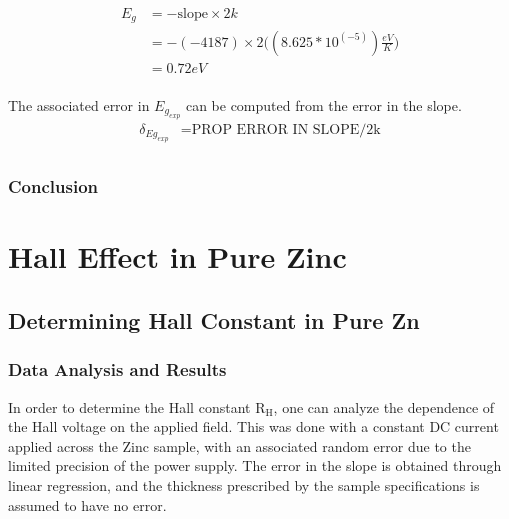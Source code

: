 \documentclass[a4paper]{article}
\begin{document}
\begin{align*}
E_g &= - \text{slope} \times 2k \\
    &= - (-4187) \times 2
       \Big(( 8.625 * 10^(-5)) \frac{eV}{K} \Big) \\
    &= 0.72 eV \\
\end{align*}

The associated error in $E_{g_{exp}}$ can be computed from the error in the slope.
\begin{align*}
\delta_{Eg_{exp}} &= \text{PROP ERROR IN SLOPE/2k} \\
\end{align*}


\subsubsection{Conclusion}

\section{Hall Effect in Pure Zinc}

\subsection{Determining Hall Constant in Pure Zn}

\subsubsection{Data Analysis and Results}
\qq In order to determine the Hall constant $\text{R}_\text{H}$, one can
analyze the dependence of the Hall voltage on the applied field. This
was done with a constant DC current applied across the Zinc sample, with
an associated random error due to the limited precision of the power
supply. The error in the slope is obtained through linear regression,
and the thickness prescribed by the sample specifications is assumed
to have no error.
\end{document}
